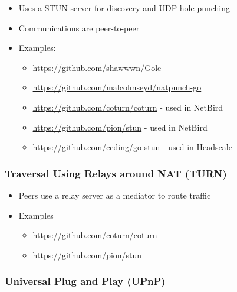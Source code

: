 \begin{itemize}
\item
  Uses a STUN server for discovery and UDP hole-punching
\item
  Communications are peer-to-peer
\item
  Examples:

  \begin{itemize}
  \item
    \url{https://github.com/shawwwn/Gole}
  \item
    \url{https://github.com/malcolmseyd/natpunch-go}
  \item
    \url{https://github.com/coturn/coturn} - used in NetBird
  \item
    \url{https://github.com/pion/stun} - used in NetBird
  \item
    \url{https://github.com/ccding/go-stun} - used in Headscale
  \end{itemize}
\end{itemize}

\hypertarget{traversal-using-relays-around-nat-turn}{%
\subsubsection{Traversal Using Relays around NAT
(TURN)}\label{traversal-using-relays-around-nat-turn}}

\begin{itemize}
\item
  Peers use a relay server as a mediator to route traffic
\item
  Examples

  \begin{itemize}
  \item
    \url{https://github.com/coturn/coturn}
  \item
    \url{https://github.com/pion/stun}
  \end{itemize}
\end{itemize}

\hypertarget{universal-plug-and-play-upnp}{%
\subsubsection{Universal Plug and Play
(UPnP)}\label{universal-plug-and-play-upnp}}

